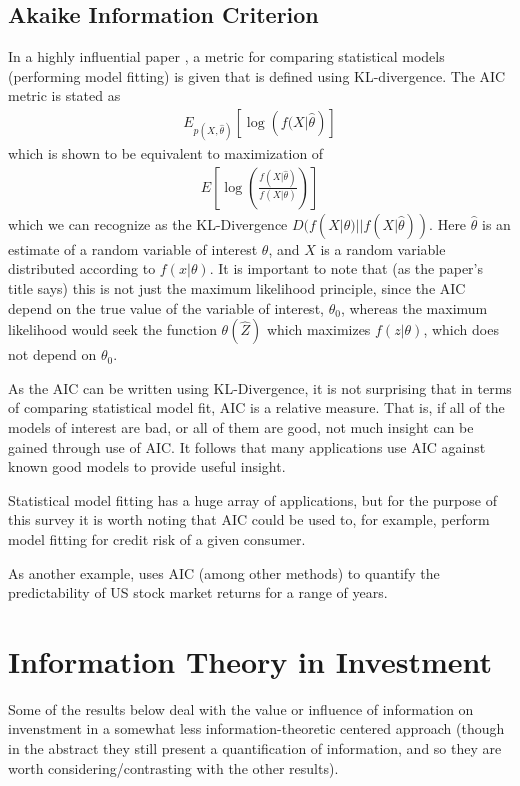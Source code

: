 \documentclass[10pt, twocolumn]{IEEEtran}
\begin{document}
\subsection{Akaike Information Criterion}
In a highly influential paper \cite{Akaike1998}, a metric for comparing statistical models (performing model fitting)
is given that is defined using KL-divergence. The AIC metric is stated as
\begin{gather*}
  E_{p(X, \hat{\theta})}\left[\log\left(f(X|\hat{\theta}\right)\right]
\end{gather*}
which is shown to be equivalent to maximization of
\begin{gather*}
  E\left[\log\left(\frac{f(X|\hat{\theta})}{f(X|\theta)}\right)\right]
\end{gather*}
which we can recognize as the KL-Divergence $D(f(X|\theta) || f(X|\hat{\theta}))$. Here $\hat{\theta}$ is
an estimate of a random variable of interest $\theta$, and $X$ is a random variable distributed according to 
$f(x|\theta)$. It is important to note that (as the paper's title says) this is not just the maximum
likelihood principle, since the AIC depend on the true value of the variable of interest, $\theta_{0}$,
whereas the maximum likelihood would seek the function $\theta(\hat{Z})$ which maximizes $f(z|\theta)$,
which does not depend on $\theta_{0}$.

As the AIC can be written using KL-Divergence, it is not surprising that in terms of comparing statistical model
fit, AIC is a relative measure. That is, if all of the models of interest are bad, or all of them are good, not
much insight can be gained through use of AIC. It follows that many applications use AIC against known good models
to provide useful insight.

Statistical model fitting has a huge array of applications, but for the purpose of this survey it is worth noting that
AIC could be used to, for example, perform model fitting for credit risk of a given consumer.

As another example, \cite{Pesaran1995} uses AIC (among other methods) to quantify the predictability
of US stock market returns for a range of years.

\section{Information Theory in Investment}
Some of the results below deal with the value or influence of information on invenstment in a
somewhat less information-theoretic centered approach (though in the abstract they still present
a quantification of information, and so they are worth considering/contrasting with the other
results).
\end{document}
